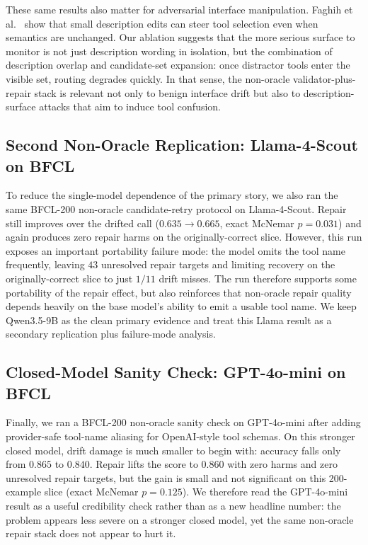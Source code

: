\documentclass[runningheads]{llncs}
\begin{document}
These same results also matter for adversarial interface manipulation. Faghih
et al.~\cite{faghih2025gaming} show that small description edits can steer tool
selection even when semantics are unchanged. Our ablation suggests that the more
serious surface to monitor is not just description wording in isolation, but the
combination of description overlap and candidate-set expansion: once distractor
tools enter the visible set, routing degrades quickly. In that sense, the
non-oracle validator-plus-repair stack is relevant not only to benign interface
drift but also to description-surface attacks that aim to induce tool confusion.

\subsection{Second Non-Oracle Replication: Llama-4-Scout on BFCL}
\label{sec:llama-replication}
To reduce the single-model dependence of the primary story, we also ran the same
BFCL-200 non-oracle candidate-retry protocol on Llama-4-Scout. Repair still
improves over the drifted call ($0.635 \rightarrow 0.665$, exact McNemar
$p=0.031$) and again produces zero repair harms on the originally-correct slice.
However, this run exposes an important portability failure mode: the model omits the
tool name frequently, leaving $43$ unresolved repair targets and limiting recovery
on the originally-correct slice to just $1/11$ drift misses. The run therefore
supports some portability of the repair effect, but also reinforces that non-oracle
repair quality depends heavily on the base model's ability to emit a usable tool
name. We keep Qwen3.5-9B as the clean primary evidence and treat this Llama result
as a secondary replication plus failure-mode analysis.

\subsection{Closed-Model Sanity Check: GPT-4o-mini on BFCL}
\label{sec:gpt-sanity}
Finally, we ran a BFCL-200 non-oracle sanity check on GPT-4o-mini after adding
provider-safe tool-name aliasing for OpenAI-style tool schemas. On this stronger
closed model, drift damage is much smaller to begin with: accuracy falls only from
$0.865$ to $0.840$. Repair lifts the score to $0.860$ with zero harms and zero
unresolved repair targets, but the gain is small and not significant on this
200-example slice (exact McNemar $p=0.125$). We therefore read the GPT-4o-mini
result as a useful credibility check rather than as a new headline number: the
problem appears less severe on a stronger closed model, yet the same non-oracle
repair stack does not appear to hurt it.
\end{document}
